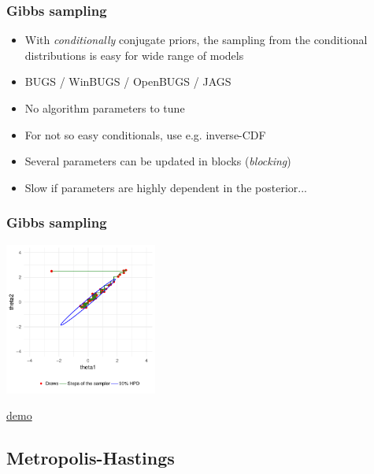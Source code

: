 \documentclass[10pt]{beamer}
\begin{document}

\begin{frame}

\frametitle{ Gibbs sampling}

  \vspace{-0.5\baselineskip}
  \begin{itemize}
  \item With {\it conditionally} conjugate priors, the sampling from
    the conditional distributions is easy for wide range of models
  \item<2-> BUGS / WinBUGS / OpenBUGS / JAGS
  \item<3-> No algorithm parameters to tune
  \item<4-> For not so easy conditionals, use  e.g. inverse-CDF
  \item<5-> Several parameters can be updated in blocks ({\em blocking})
  \item<6-> Slow if parameters are highly dependent in the posterior...
  \end{itemize}

\end{frame}

\begin{frame}
\frametitle{Gibbs sampling}

    \vspace{-.5\baselineskip}
     \begin{center}
       \includegraphics[width=5cm]{figs/Gibbs2.pdf}
     \end{center}
    \vspace{-.5\baselineskip}
     \begin{center}
       \href{https://github.com/MansMeg/BSDA/blob/main/lectures/L5/figs/gibbs_example_correlated.gif}{demo}
     \end{center}
\end{frame}

\subsection{Metropolis-Hastings}
\end{document}
